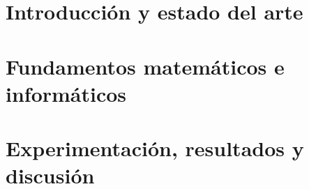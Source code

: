 \documentclass{ugrTFG}
\begin{document}
\maketitle

\frontmatter %









\mainmatter %

\part{Introducción y estado del arte}\label{part:introduccion}



\cleardoublepage
\part{Fundamentos matemáticos e informáticos}\label{part:fundamentos}






\cleardoublepage
\part{Experimentación, resultados y discusión}\label{part:experimentacion}





\end{document}
